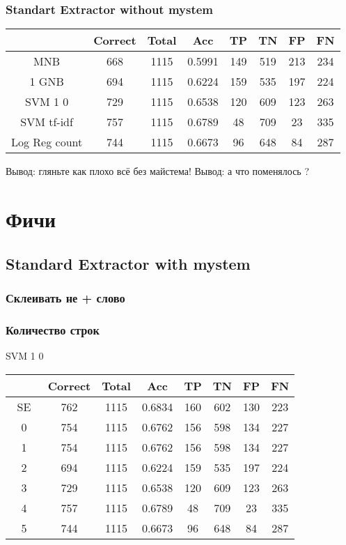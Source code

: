 \documentclass[a4paper, 12pt]{article}
\theoremstyle{plain}
\theoremstyle{definition}
\theoremstyle{remark}
\begin{document}
\subsubsection{Standart Extractor without mystem}
\begin{tabular}{|c|c|c|c|c|c|c|c|}
\hline
  ~~~~ & Correct & Total & Acc & TP & TN & FP & FN \\
  \hline
  MNB & 668 & 1115 & 0.5991 & 149 & 519 & 213 & 234  \\
  \hline
1  GNB & 694 & 1115 & 0.6224 & 159 & 535 & 197 & 224 \\
  \hline
  SVM 1 0 & 729 & 1115 & 0.6538 & 120 & 609 & 123 & 263 \\
  \hline
  SVM tf-idf & 757 & 1115 & 0.6789 & 48 & 709 & 23 & 335 \\
  \hline
  Log Reg count & 744 & 1115 & 0.6673 & 96 & 648 & 84 & 287 \\
\hline
\end{tabular}

Вывод: гляньте как плохо всё без майстема! Вывод: а что поменялось ?

\section{Фичи}
\subsection{Standard Extractor with mystem}
\subsubsection{Склеивать не + слово}



\subsubsection{Количество строк}
SVM 1 0

\begin{tabular}{|c|c|c|c|c|c|c|c|}
\hline
  ~~~~ & Correct & Total & Acc & TP & TN & FP & FN \\
  \hline
  SE & 762 & 1115 & 0.6834 & 160 & 602 & 130 & 223  \\
  \hline
  0 & 754 & 1115 & 0.6762 & 156 & 598 & 134 & 227  \\
  \hline
  1 & 754 & 1115 & 0.6762 & 156 & 598 & 134 & 227  \\
  \hline
  2 & 694 & 1115 & 0.6224 & 159 & 535 & 197 & 224 \\
  \hline
  3 & 729 & 1115 & 0.6538 & 120 & 609 & 123 & 263 \\
  \hline
  4 & 757 & 1115 & 0.6789 & 48 & 709 & 23 & 335 \\
  \hline
  5 & 744 & 1115 & 0.6673 & 96 & 648 & 84 & 287 \\
\hline
\end{tabular}
\end{document}

